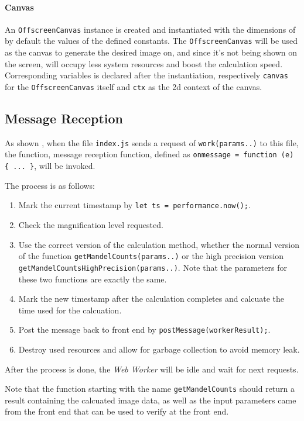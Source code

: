 \paragraph{Canvas} An \texttt{OffscreenCanvas} instance is created and instantiated with the dimensions of by default the values of the defined constants. The \texttt{OffscreenCanvas} will be used as the canvas to generate the desired image on, and since it's not being shown on the screen, will occupy less system resources and boost the calculation speed. Corresponding variables is declared after the instantiation, respectively \texttt{canvas} for the \texttt{OffscreenCanvas} itself and \texttt{ctx} as the 2d context of the canvas.

\subsection{Message Reception}

As shown , when the file \texttt{index.js} sends a request of \texttt{work(params..)} to this file, the function, message reception function, defined as \texttt{onmessage = function (e) \{ ... \}}, will be invoked.

The process is as follows:

\begin{enumerate}
  \item Mark the current timestamp by \texttt{let ts = performance.now();}.
  \item Check the magnification level requested.
  \item Use the correct version of the calculation method, whether the normal version of the function \texttt{getMandelCounts(params..)} or the high precision version \texttt{getMandelCountsHighPrecision(params..)}. Note that the parameters for these two functions are exactly the same.
  \item Mark the new timestamp after the calculation completes and calcuate the time used for the calcuation.
  \item Post the message back to front end by \texttt{postMessage(workerResult);}.
  \item Destroy used resources and allow for garbage collection to avoid memory leak.
\end{enumerate}

After the process is done, the \emph{Web Worker} will be idle and wait for next requests.

Note that the function starting with the name \texttt{getMandelCounts} should return a result containing the calcuated image data, as well as the input parameters came from the front end that can be used to verify at the front end.

